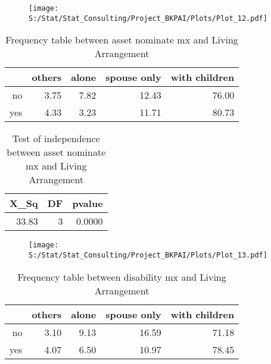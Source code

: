 \documentclass[11pt]{article}
\begin{document}
\begin{center}
\begin{figure}[H]
\texttt{[image: S:/Stat/Stat\_Consulting/Project\_BKPAI/Plots/Plot\_12.pdf]}

\end{figure}
\end{center}
\begin{table}[H]
\centering
\begin{tabular}{rrrrr}
  \hline
 & others & alone & spouse only & with children \\ 
  \hline
no & 3.75 & 7.82 & 12.43 & 76.00 \\ 
  yes & 4.33 & 3.23 & 11.71 & 80.73 \\ 
   \hline
\end{tabular}
\caption{Frequency table between asset nominate mx and Living Arrangement} 
\end{table}
\begin{table}[H]
\centering
\begin{tabular}{rrr}
  \hline
X\_Sq & DF & pvalue \\ 
  \hline
33.83 & 3 & 0.0000 \\ 
   \hline
\end{tabular}
\caption{Test of independence between asset nominate mx and Living Arrangement} 
\end{table}
\begin{center}
\begin{figure}[H]
\texttt{[image: S:/Stat/Stat\_Consulting/Project\_BKPAI/Plots/Plot\_13.pdf]}

\end{figure}
\end{center}
\begin{table}[H]
\centering
\begin{tabular}{rrrrr}
  \hline
 & others & alone & spouse only & with children \\ 
  \hline
no & 3.10 & 9.13 & 16.59 & 71.18 \\ 
  yes & 4.07 & 6.50 & 10.97 & 78.45 \\ 
   \hline
\end{tabular}
\caption{Frequency table between disability mx and Living Arrangement} 
\end{table}
\end{document}
